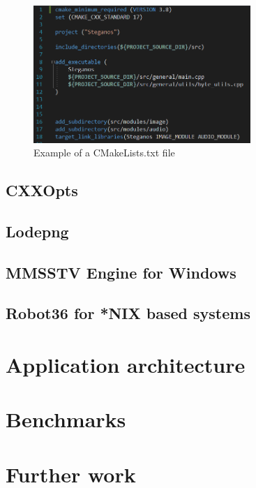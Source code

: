 \begin{multicols*}{2}
\begin{figure}[H]
    \centering
    \includegraphics[height=5.2cm,keepaspectratio]{pics/cmake_file_example}
    \caption{Example of a CMakeLists.txt file}
\end{figure}

\subsection{CXXOpts}
\subsection{Lodepng}
\subsection{MMSSTV Engine for Windows}
\subsection{Robot36 for *NIX based systems}

\section{Application architecture}

\section{Benchmarks}

\section{Further work}
\end{multicols*}